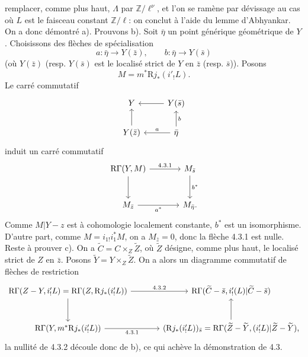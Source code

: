 remplacer, comme plus haut, $\Lambda$ par $\mathbb{Z}/\ell^\nu$, et l'on se ramène par dévissage au cas où $L$ est le faisceau constant $\mathbb{Z}/\ell$: on conclut à l'aide du lemme d'Abhyankar. On a donc démontré a). Prouvons b). Soit $\bar\eta$ un point générique géométrique de $Y$. Choisissons des flèches de spécialisation
\[
a:\bar\eta\to Y(\bar z),\qquad b:\bar\eta\to Y(\bar s)
\]
(où $Y(\bar z)$ (resp. $Y(\bar s)$ est le localisé strict de $Y$ en $\bar z$ (resp. $\bar s$)). Posons
\[
M=m^*\mathrm{R} j_*(i'_!L).
\]
Le carré commutatif
\[
\begin{tikzcd}
Y & Y(\bar s)\arrow[l]\\
Y(\bar z)\arrow[u] & \bar\eta \arrow[l,"a"']\arrow[u,"b"']
\end{tikzcd}
\]
induit un carré commutatif
\[
\begin{tikzcd}[column sep=large,row sep=large]
\mathrm{R}\Gamma(Y,M) \arrow[r,"4.3.1"] \arrow[d] & M_{\bar s} \arrow[d,"b^*"]\\
M_{\bar z} \arrow[r,"a^*"'] & M_{\bar\eta}.
\end{tikzcd}
\]
Comme $M|Y-z$ est à cohomologie localement constante, $b^*$ est un isomorphisme. D'autre part, comme $M=i_{1!}i_1^*M$, on a $M_{\bar z}=0$, donc la flèche 4.3.1 est nulle. Reste à prouver c). On a $\widetilde C=C\times_Z\widetilde Z$, où $\widetilde Z$ désigne, comme plus haut, le localisé strict de $Z$ en $\bar z$. Posons $\widetilde Y=Y\times_Z\widetilde Z$. On a alors un diagramme commutatif de flèches de restriction
\[
\begin{tikzcd}[column sep=large,row sep=large]
\mathrm{R}\Gamma(Z-Y,i'_!L)=\mathrm{R}\Gamma(Z,\mathrm{R} j_*(i'_!L))
 \arrow[r,"4.3.2"] \arrow[d]
&
\mathrm{R}\Gamma(\widetilde C-\bar s,i'_!(L)|\widetilde C-\bar s)\\
\mathrm{R}\Gamma(Y,m^*\mathrm{R} j_*(i'_!L)) \arrow[r,"4.3.1"']
&
(\mathrm{R} j_*(i'_!L))_{\bar s}
  =\mathrm{R}\Gamma(\widetilde Z-\widetilde Y,(i'_!L)|\widetilde Z-\widetilde Y) , \arrow[u]
\end{tikzcd}
\]
la nullité de 4.3.2 découle donc de b), ce qui achève la démonstration de 4.3.

